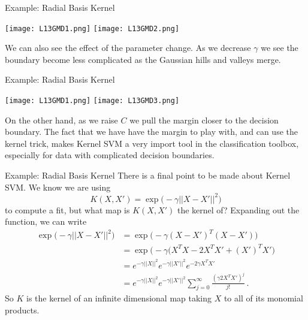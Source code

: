 \documentclass[10pt, table, dvipsnames,xcdraw]{beamer}
\begin{document}
\begin{frame}[fragile]{Example: Radial Basis Kernel}
  \begin{minipage}[t][0.6\textheight][t]{\textwidth}
	\centering \texttt{[image: L13GMD1.png]}
	\texttt{[image: L13GMD2.png]}
  \end{minipage}
  \vfill
\begin{minipage}[t][0.4\textheight][t]{\textwidth}
We can also see the effect of the parameter change. As we decrease $\gamma$ we see the boundary become less complicated as the Gaussian hills and valleys merge. 
\end{minipage}
\end{frame}


\begin{frame}[fragile]{Example: Radial Basis Kernel}
  \begin{minipage}[t][0.6\textheight][t]{\textwidth}
	\centering \texttt{[image: L13GMD1.png]}
	\texttt{[image: L13GMD3.png]}
  \end{minipage}
  \vfill
\begin{minipage}[t][0.4\textheight][t]{\textwidth}
On the other hand, as we raise $C$ we pull the margin closer to the decision boundary. The fact that we have have the margin to play with, and can use the kernel trick, makes Kernel SVM a very import tool in the classification toolbox, especially for data with complicated decision boundaries. 
\end{minipage}
\end{frame}






\begin{frame}[fragile]{Example: Radial Basis Kernel}
There is a final point to be made about Kernel SVM. We know we are using 
$$
K(X,X')=\exp\big(-\gamma||X-X'||^2\big)
$$
to compute a fit, but what map is $K(X,X')$ the kernel of? \pause Expanding out the function, we can write
\begin{align*}
\exp\big(-\gamma||X-X'||^2\big) &= \exp\big(-\gamma(X-X')^T(X-X')\big)
\\
&= \exp\big(-\gamma(X^TX - 2X^TX' + (X')^TX'\big)
\\
&= e^{-\gamma ||X||^2} e^{-\gamma ||X'||^2} e^{-2\gamma X^TX'} 
\\
&= e^{-\gamma ||X||^2} e^{-\gamma ||X'||^2} \sum_{j=0}^\infty \frac{(\gamma 2X^TX')^j}{j!}\,.
\end{align*}
So $K$ is the kernel of an infinite dimensional map taking $X$ to all of its monomial products. 
\end{frame}
\end{document}
